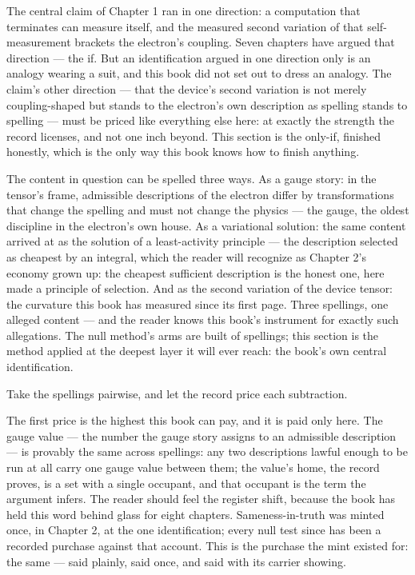 The central claim of Chapter 1 ran in one direction: a computation that terminates
can measure itself, and the measured second variation of that self-measurement
brackets the electron's coupling. Seven chapters have argued that direction --- the
if. But an identification argued in one direction only is an analogy wearing a
suit, and this book did not set out to dress an analogy. The claim's other
direction --- that the device's second variation is not merely coupling-shaped but
stands to the electron's own description as spelling stands to spelling --- must be
priced like everything else here: at exactly the strength the record licenses, and
not one inch beyond. This section is the only-if, finished honestly, which is the
only way this book knows how to finish anything.

The content in question can be spelled three ways. As a gauge story: in the
tensor's frame, admissible descriptions of the electron differ by transformations
that change the spelling and must not change the physics --- the gauge, the oldest
discipline in the electron's own house. As a variational solution: the same content
arrived at as the solution of a least-activity principle --- the description
selected as cheapest by an integral, which the reader will recognize as Chapter 2's
economy grown up: the cheapest sufficient description is the honest one, here made
a principle of selection. And as the second variation of the device tensor: the
curvature this book has measured since its first page. Three spellings, one alleged
content --- and the reader knows this book's instrument for exactly such
allegations. The null method's arms are built of spellings; this section is the
method applied at the deepest layer it will ever reach: the book's own central
identification.

Take the spellings pairwise, and let the record price each subtraction.

The first price is the highest this book can pay, and it is paid only here. The
gauge value --- the number the gauge story assigns to an admissible description
--- is provably the same across spellings: any two descriptions lawful enough to
be run at all carry one gauge value between them; the value's home, the record
proves, is a set with a single occupant, and that occupant is the term the
argument infers. The reader should feel the register shift, because the book has
held this word behind glass for eight chapters. Sameness-in-truth was minted
once, in Chapter 2, at the one identification; every null test since has been a
recorded purchase against that account. This is the purchase the mint existed
for: the same --- said plainly, said once, and said with its carrier showing.

